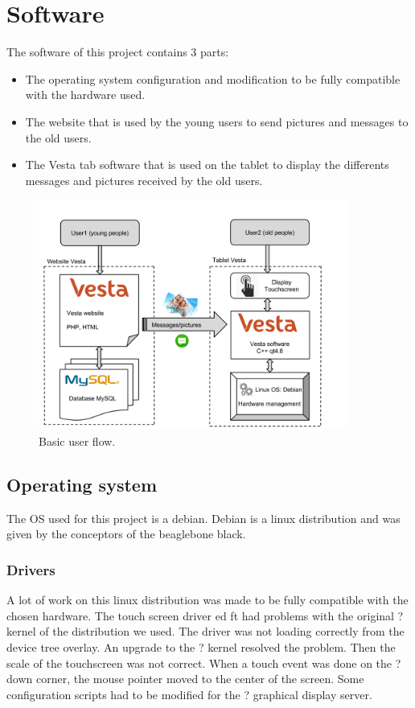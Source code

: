 \section{Software}
The software of this project contains 3 parts:
\begin{itemize}
\item{The operating system configuration and modification to be fully compatible with the hardware used.}
\item{The website that is used by the young users to send pictures and messages to the old users.}
\item{The Vesta tab software that is used on the tablet to display the differents messages and pictures received by the old users.
}
\end{itemize}

\begin{figure}[!htb]
    \centering
    \includegraphics[width=0.9\textwidth,keepaspectratio]{chap/softFig/block_diagram_vesta2.png}
    \caption{Basic user flow.}
    \label{fig:user flow}
\end{figure}

\subsection{Operating system}
The OS used for this project is a debian. Debian is a linux distribution and was given by the conceptors of the beaglebone black.
\subsubsection{Drivers}
A lot of work on this linux distribution was made to be fully compatible with the chosen hardware.
The touch screen driver ed ft had problems with the original ? kernel of the distribution we used. The driver was not loading correctly from the device tree overlay. An upgrade to the ? kernel resolved the problem.
Then the scale of the touchscreen was not correct. 
When a touch event was done on the ? down corner,
 the mouse pointer moved to the center of the screen. Some configuration scripts had to be modified for the ? graphical display server.
